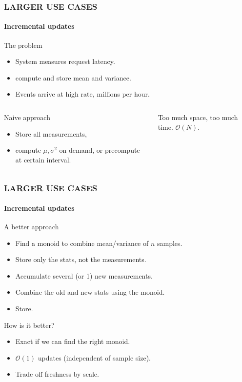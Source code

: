 \documentclass{beamer}
\begin{document}
\begin{frame} \frametitle{LARGER USE CASES}
  \framesubtitle{Incremental updates}
  \begin{block}{The problem}
    \begin{itemize}
      \item System measures request latency.
      \item \alert{compute} and store \alert{mean} and \alert{variance.}
      \item Events arrive at high rate, \alert{millions per hour.}
    \end{itemize}
  \end{block} \pause
  \begin{columns}[c]
      \begin{block}{Naive approach}
        \begin{itemize}
        \item Store all measurements,
        \item compute \(\mu, \sigma^2\) on demand, or
          precompute at certain interval.
        \end{itemize}
      \end{block}

  Too much \alert{space}, too much \alert{time}. \(\mathcal{O}(N)\).
  \end{columns}
\end{frame}

\begin{frame} \frametitle{LARGER USE CASES}
  \framesubtitle{Incremental updates}
  \begin{block}{A better approach}
  \begin{itemize}
    \item Find a \alert{monoid} to combine \alert{mean/variance} of \(n\) samples.
    \item Store only the stats, not the measurements.
    \item Accumulate several (or 1) new measurements.
    \item \alert{Combine} the old and new stats using the monoid.
    \item Store.
  \end{itemize}
  \end{block}

  \begin{block}{How is it better?}
  \begin{itemize}
    \item \alert{Exact} if we can find the right monoid.
    \item \alert{\(\mathcal{O}(1)\) updates} (independent of sample size).
    \item Trade off freshness by scale.
  \end{itemize}
  \end{block}
\end{frame}
\end{document}

